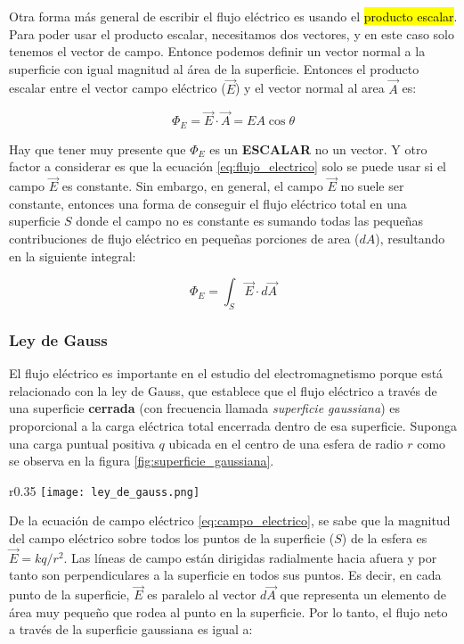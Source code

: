 Otra forma más general de escribir el flujo eléctrico es usando el \hl{producto escalar}. Para poder usar el producto escalar, necesitamos dos vectores, y en este caso solo tenemos el vector de campo. Entonce podemos definir un vector normal a la superficie con igual magnitud al área de la superficie. Entonces el producto escalar entre el vector campo eléctrico (\(\vec{E}\)) y el vector normal al area \(\vec{A}\) es:

\begin{equation}
    \Phi_E = \vec{E} \cdot \vec{A} = E A \cos \theta
    \label{eq:flujo_electrico}
\end{equation}

Hay que tener muy presente que \(\Phi_E\) es un \textbf{ESCALAR} no un vector. Y otro factor a considerar es que la ecuación \eqref{eq:flujo_electrico} solo se puede usar si el campo \(\vec{E}\) es constante. Sin embargo, en general, el campo \(\vec{E}\) no suele ser constante, entonces una forma de conseguir el flujo eléctrico total en una superficie \(S\) donde el campo no es constante es sumando todas las pequeñas contribuciones de flujo eléctrico en pequeñas porciones de area (\(dA\)), resultando en la siguiente integral:

\begin{equation}
    \Phi_E = \int_{S} \vec{E} \cdot d\vec{A}
    \label{eq:flujo_electrico_integral}
\end{equation}

\subsubsection{Ley de Gauss}

El flujo eléctrico es importante en el estudio del electromagnetismo porque está relacionado con la ley de Gauss, que establece que el flujo eléctrico a través de una superficie \textbf{cerrada} (con frecuencia llamada \textit{superficie gaussiana}) es proporcional a la carga eléctrica total encerrada dentro de esa superficie. Suponga una carga puntual positiva \(q\) ubicada en el centro de una esfera de radio \(r\) como se observa en la figura \ref{fig:superficie_gaussiana}.

\begin{wrapfigure}{r}{0.35\textwidth}
    \centering
    \texttt{[image: ley\_de\_gauss.png]}
    \caption{Superficie gaussiana esférica de radio \(r\) que rodea una carga puntual \(q\).}
    \label{fig:superficie_gaussiana}
\end{wrapfigure}
De la ecuación de campo eléctrico \eqref{eq:campo_electrico}, se sabe que la magnitud del campo eléctrico sobre todos los puntos de la superficie (\(S\)) de la esfera es \(\vec{E} = k q/r^2\). Las líneas de campo están dirigidas radialmente hacia afuera y por tanto son perpendiculares a la superficie en todos sus puntos. Es decir, en cada punto de la superficie, \(\vec{E}\) es paralelo al vector \(d\vec{A}\) que representa un elemento de área muy pequeño que rodea al punto en la superficie. Por lo tanto, el flujo neto a través de la superficie gaussiana es igual a:

